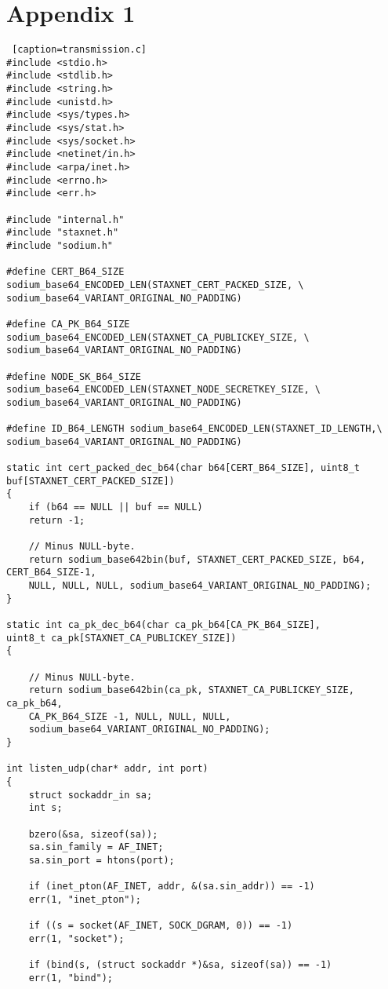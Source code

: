 \chapter{Appendix 1}
\label{appendix:listing1}

\lstset{language=C}
\begin{lstlisting} [caption=transmission.c]
#include <stdio.h>
#include <stdlib.h>
#include <string.h>
#include <unistd.h>
#include <sys/types.h>
#include <sys/stat.h>
#include <sys/socket.h>
#include <netinet/in.h>
#include <arpa/inet.h>
#include <errno.h>
#include <err.h>

#include "internal.h"
#include "staxnet.h"
#include "sodium.h"

#define CERT_B64_SIZE sodium_base64_ENCODED_LEN(STAXNET_CERT_PACKED_SIZE, \
sodium_base64_VARIANT_ORIGINAL_NO_PADDING)

#define CA_PK_B64_SIZE sodium_base64_ENCODED_LEN(STAXNET_CA_PUBLICKEY_SIZE, \
sodium_base64_VARIANT_ORIGINAL_NO_PADDING)

#define NODE_SK_B64_SIZE sodium_base64_ENCODED_LEN(STAXNET_NODE_SECRETKEY_SIZE, \
sodium_base64_VARIANT_ORIGINAL_NO_PADDING)

#define ID_B64_LENGTH sodium_base64_ENCODED_LEN(STAXNET_ID_LENGTH,\
sodium_base64_VARIANT_ORIGINAL_NO_PADDING)

static int cert_packed_dec_b64(char b64[CERT_B64_SIZE], uint8_t buf[STAXNET_CERT_PACKED_SIZE])
{
	if (b64 == NULL || buf == NULL)
	return -1;
	
	// Minus NULL-byte.
	return sodium_base642bin(buf, STAXNET_CERT_PACKED_SIZE, b64, CERT_B64_SIZE-1,
	NULL, NULL, NULL, sodium_base64_VARIANT_ORIGINAL_NO_PADDING);
}

static int ca_pk_dec_b64(char ca_pk_b64[CA_PK_B64_SIZE],
uint8_t ca_pk[STAXNET_CA_PUBLICKEY_SIZE])
{
	
	// Minus NULL-byte.
	return sodium_base642bin(ca_pk, STAXNET_CA_PUBLICKEY_SIZE, ca_pk_b64,
	CA_PK_B64_SIZE -1, NULL, NULL, NULL,
	sodium_base64_VARIANT_ORIGINAL_NO_PADDING);
}

int listen_udp(char* addr, int port)
{
	struct sockaddr_in sa;
	int s;
	
	bzero(&sa, sizeof(sa));
	sa.sin_family = AF_INET;
	sa.sin_port = htons(port);
	
	if (inet_pton(AF_INET, addr, &(sa.sin_addr)) == -1)
	err(1, "inet_pton");
	
	if ((s = socket(AF_INET, SOCK_DGRAM, 0)) == -1)
	err(1, "socket");
	
	if (bind(s, (struct sockaddr *)&sa, sizeof(sa)) == -1)
	err(1, "bind");
	

\end{lstlisting}
